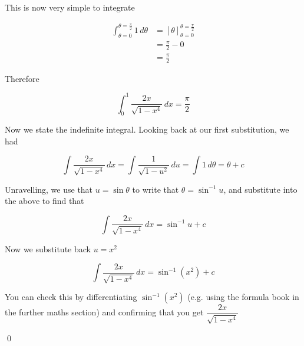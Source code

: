 \begin{solution}
    This is now very simple to integrate

    \begin{align*}
        \int_{\theta=0}^{\theta=\frac{\pi}{2}} 1 \, d\theta
        &= \left[ \theta \right]_{\theta=0}^{\theta=\frac{\pi}{2}} \\
        &= \frac{\pi}{2} - 0 \\
        &= \frac{\pi}{2}
    \end{align*}

    Therefore

    \[
        \int_{0}^{1} \frac{2x}{\sqrt{1 - x^4}} \, dx = \frac{\pi}{2}
    \]

    Now we state the indefinite integral. Looking back at our first substitution, we had

    \[
        \int \frac{2x}{\sqrt{1 - x^4}} \, dx = \int \frac{1}{\sqrt{1 - u^2}} \, du = \int 1 \, d\theta = \theta + c
    \]

    Unravelling, we use that $u = \sin \theta$ to write that $\theta = \sin^{-1}u$, and substitute into the above to find that

    \[
        \int \frac{2x}{\sqrt{1 - x^4}}  \, dx = \sin^{-1} u + c
    \]

    Now we substitute back $u = x^2$

    \[
        \int \frac{2x}{\sqrt{1 - x^4}} \, dx = \sin^{-1}(x^2) + c
    \]

    You can check this by differentiating $\sin^{-1}(x^2)$ (e.g. using the formula book in the further maths section) and confirming that you get $\dfrac{2x}{\sqrt{1 - x^4}}$

    \qed
\end{solution}

